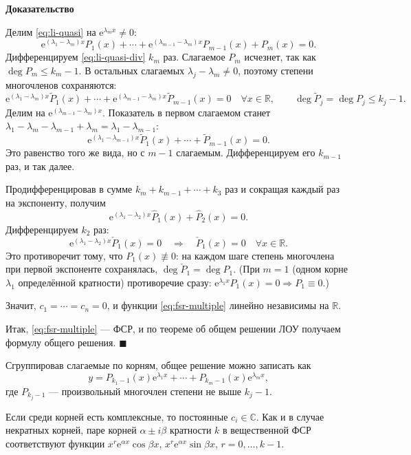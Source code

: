 \documentclass[12pt,a4paper]{article}
\numberwithin{equation}{section}
\newcommand{\R}{\mathbb{R}}
\newcommand{\e}{\mathrm{e}}
\renewenvironment{proof}[1][Доказательство]{\begin{center}\textbf{#1}\end{center}}{\hfill$\blacksquare$\par}
\begin{document}
\begin{proof}
\begin{enumerate}[start=0]
Делим \eqref{eq:li-quasi} на \(\e^{\lambda_mx}\neq0\):
\begin{equation}
\e^{(\lambda_1-\lambda_m)x}P_1(x)+\cdots+\e^{(\lambda_{m-1}-\lambda_m)x}P_{m-1}(x)+P_m(x)=0.
\label{eq:li-quasi-div}
\end{equation}
Дифференцируем \eqref{eq:li-quasi-div} \(k_m\) раз. Слагаемое \(P_m\) исчезнет, так как \(\deg P_m\le k_m-1\). В остальных слагаемых \(\lambda_j-\lambda_m\neq0\), поэтому степени многочленов сохраняются:
\[
\e^{(\lambda_1-\lambda_m)x}\tilde P_1(x)+\cdots+\e^{(\lambda_{m-1}-\lambda_m)x}\tilde P_{m-1}(x)=0\quad\forall x\in\R,
\qquad\deg\tilde P_j=\deg P_j\le k_j-1.
\]
Делим на \(\e^{(\lambda_{m-1}-\lambda_m)x}\). Показатель в первом слагаемом станет \(\lambda_1-\lambda_m-\lambda_{m-1}+\lambda_m=\lambda_1-\lambda_{m-1}\):
\[
\e^{(\lambda_1-\lambda_{m-1})x}\tilde P_1(x)+\cdots+\tilde P_{m-1}(x)=0.
\]
Это равенство того же вида, но с \(m-1\) слагаемым. Дифференцируем его \(k_{m-1}\) раз, и так далее.

Продифференцировав в сумме \(k_m+k_{m-1}+\cdots+k_3\) раз и сокращая каждый раз на экспоненту, получим
\[
\e^{(\lambda_1-\lambda_2)x}\hat P_1(x)+\hat P_2(x)=0.
\]
Дифференцируем \(k_2\) раз:
\[
\e^{(\lambda_1-\lambda_2)x}\check P_1(x)=0\quad\Longrightarrow\quad\check P_1(x)=0\quad\forall x\in\R.
\]
Это противоречит тому, что \(P_1(x)\not\equiv0\): на каждом шаге степень многочлена при первой экспоненте сохранялась, \(\deg\check P_1=\deg P_1\). (При \(m=1\) (одном корне \(\lambda_1\) определённой кратности) противоречие сразу: \(\e^{\lambda_1x}P_1(x)=0\Rightarrow P_1\equiv0\).)

Значит, \(c_1=\cdots=c_n=0\), и функции \eqref{eq:fsr-multiple} линейно независимы на \(\R\).
\end{enumerate}
Итак, \eqref{eq:fsr-multiple} --- ФСР, и по теореме об общем решении ЛОУ получаем формулу общего решения.
\end{proof}

\begin{remarkHSE}
Сгруппировав слагаемые по корням, общее решение можно записать как
\[
y=P_{k_1-1}(x)\e^{\lambda_1x}+\cdots+P_{k_m-1}(x)\e^{\lambda_mx},
\]
где \(P_{k_j-1}\) --- произвольный многочлен степени не выше \(k_j-1\).

Если среди корней есть комплексные, то постоянные \(c_i\in\mathbb C\). Как и в случае некратных корней, паре корней \(\alpha\pm i\beta\) кратности \(k\) в вещественной ФСР соответствуют функции \(x^r\e^{\alpha x}\cos\beta x\), \(x^r\e^{\alpha x}\sin\beta x\), \(r=0,\ldots,k-1\).
\end{remarkHSE}
\end{document}
